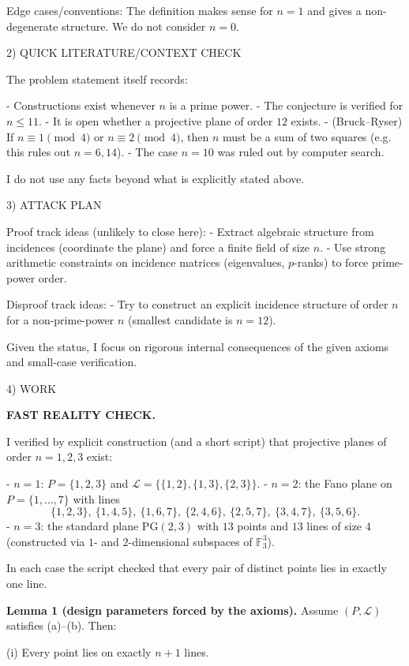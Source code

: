 Edge cases/conventions: The definition makes sense for $n=1$ and gives a non-degenerate structure. We do not consider $n=0$.

2) QUICK LITERATURE/CONTEXT CHECK

The problem statement itself records:

- Constructions exist whenever $n$ is a prime power.
- The conjecture is verified for $n\le 11$.
- It is open whether a projective plane of order $12$ exists.
- (Bruck--Ryser) If $n\equiv 1\pmod 4$ or $n\equiv 2\pmod 4$, then $n$ must be a sum of two squares (e.g. this rules out $n=6,14$).
- The case $n=10$ was ruled out by computer search.

I do not use any facts beyond what is explicitly stated above.

3) ATTACK PLAN

Proof track ideas (unlikely to close here):
- Extract algebraic structure from incidences (coordinate the plane) and force a finite field of size $n$.
- Use strong arithmetic constraints on incidence matrices (eigenvalues, $p$-ranks) to force prime-power order.

Disproof track ideas:
- Try to construct an explicit incidence structure of order $n$ for a non-prime-power $n$ (smallest candidate is $n=12$).

Given the status, I focus on rigorous internal consequences of the given axioms and small-case verification.

4) WORK

\textbf{FAST REALITY CHECK.}

I verified by explicit construction (and a short script) that projective planes of order $n=1,2,3$ exist:

- $n=1$: $P=\{1,2,3\}$ and $\mathcal L=\{\{1,2\},\{1,3\},\{2,3\}\}$.
- $n=2$: the Fano plane on $P=\{1,\dots,7\}$ with lines
  \[
  \{1,2,3\},\ \{1,4,5\},\ \{1,6,7\},\ \{2,4,6\},\ \{2,5,7\},\ \{3,4,7\},\ \{3,5,6\}.
  \]
- $n=3$: the standard plane $\mathrm{PG}(2,3)$ with $13$ points and $13$ lines of size $4$ (constructed via $1$- and $2$-dimensional subspaces of $\mathbb F_3^3$).

In each case the script checked that every pair of distinct points lies in exactly one line.

\medskip

\textbf{Lemma 1 (design parameters forced by the axioms).}
Assume $(P,\mathcal L)$ satisfies (a)--(b). Then:

(i) Every point lies on exactly $n+1$ lines.

